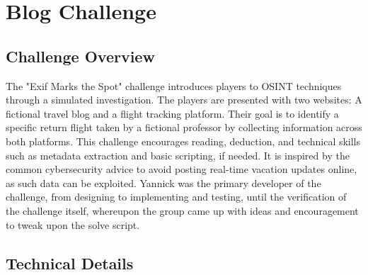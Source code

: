\section{Blog Challenge}\label{sec:blog-challenge}
\subsection{Challenge Overview}
The "Exif Marks the Spot" challenge introduces players to OSINT\cite{WhatisOSINT} techniques through a simulated investigation. The players are presented with two websites: A fictional travel blog and a flight tracking platform. Their goal is to identify a specific return flight taken by a fictional professor by collecting information across both platforms. This challenge encourages reading, deduction, and technical skills such as metadata extraction and basic scripting, if needed. It is inspired by the common cybersecurity advice to avoid posting real-time vacation updates online, as such data can be exploited. Yannick was the primary developer of the challenge, from designing to implementing and testing, until the verification of the challenge itself, whereupon the group came up with ideas and encouragement to tweak upon the solve script.
\subsection{Technical Details}

